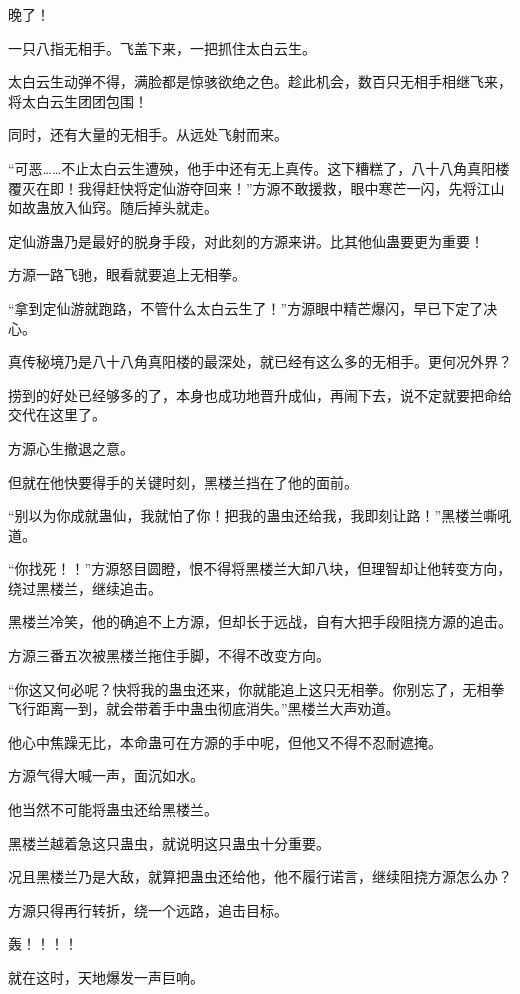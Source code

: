 \begin{this_body}
晚了！

一只八指无相手。飞盖下来，一把抓住太白云生。

太白云生动弹不得，满脸都是惊骇欲绝之色。趁此机会，数百只无相手相继飞来，将太白云生团团包围！

同时，还有大量的无相手。从远处飞射而来。

“可恶……不止太白云生遭殃，他手中还有无上真传。这下糟糕了，八十八角真阳楼覆灭在即！我得赶快将定仙游夺回来！”方源不敢援救，眼中寒芒一闪，先将江山如故蛊放入仙窍。随后掉头就走。

定仙游蛊乃是最好的脱身手段，对此刻的方源来讲。比其他仙蛊要更为重要！

方源一路飞驰，眼看就要追上无相拳。

“拿到定仙游就跑路，不管什么太白云生了！”方源眼中精芒爆闪，早已下定了决心。

真传秘境乃是八十八角真阳楼的最深处，就已经有这么多的无相手。更何况外界？

捞到的好处已经够多的了，本身也成功地晋升成仙，再闹下去，说不定就要把命给交代在这里了。

方源心生撤退之意。

但就在他快要得手的关键时刻，黑楼兰挡在了他的面前。

“别以为你成就蛊仙，我就怕了你！把我的蛊虫还给我，我即刻让路！”黑楼兰嘶吼道。

“你找死！！”方源怒目圆瞪，恨不得将黑楼兰大卸八块，但理智却让他转变方向，绕过黑楼兰，继续追击。

黑楼兰冷笑，他的确追不上方源，但却长于远战，自有大把手段阻挠方源的追击。

方源三番五次被黑楼兰拖住手脚，不得不改变方向。

“你这又何必呢？快将我的蛊虫还来，你就能追上这只无相拳。你别忘了，无相拳飞行距离一到，就会带着手中蛊虫彻底消失。”黑楼兰大声劝道。

他心中焦躁无比，本命蛊可在方源的手中呢，但他又不得不忍耐遮掩。

方源气得大喊一声，面沉如水。

他当然不可能将蛊虫还给黑楼兰。

黑楼兰越着急这只蛊虫，就说明这只蛊虫十分重要。

况且黑楼兰乃是大敌，就算把蛊虫还给他，他不履行诺言，继续阻挠方源怎么办？

方源只得再行转折，绕一个远路，追击目标。

轰！！！！

就在这时，天地爆发一声巨响。


\end{this_body}
